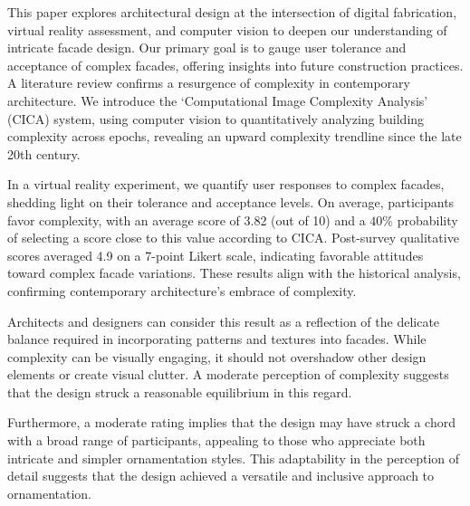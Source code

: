 


This paper explores architectural design at the intersection of digital fabrication, virtual reality assessment, and computer vision to deepen our understanding of intricate facade design.
Our primary goal is to gauge user tolerance and acceptance of complex facades, offering insights into future construction practices.
A literature review confirms a resurgence of complexity in contemporary architecture.
We introduce the `Computational Image Complexity Analysis' (CICA) system, using computer vision to quantitatively analyzing building complexity across epochs, revealing an upward complexity trendline since the late 20th century.

In a virtual reality experiment, we quantify user responses to complex facades, shedding light on their tolerance and acceptance levels.
On average, participants favor complexity, with an average score of 3.82 (out of 10) and a \(40\%\) probability of selecting a score close to this value according to CICA.
Post-survey qualitative scores averaged 4.9 on a 7-point Likert scale, indicating favorable attitudes toward complex facade variations.
These results align with the historical analysis, confirming contemporary architecture's embrace of complexity.

 Architects and designers can consider this result as a reflection of the delicate balance required in incorporating patterns and textures into facades.
 While complexity can be visually engaging, it should not overshadow other design elements or create visual clutter.
 A moderate perception of complexity suggests that the design struck a reasonable equilibrium in this regard.


Furthermore, a moderate rating implies that the design may have struck a chord with a broad range of participants, appealing to those who appreciate both intricate and simpler ornamentation styles.
 This adaptability in the perception of detail suggests that the design achieved a versatile and inclusive approach to ornamentation.

